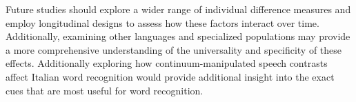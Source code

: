 
Future studies should explore a wider range of individual difference measures and employ longitudinal designs to assess how these factors interact over time. Additionally, examining other languages and specialized populations may provide a more comprehensive understanding of the universality and specificity of these effects. Additionally exploring how continuum-manipulated speech contrasts affect Italian word recognition would provide additional insight into the exact cues that are most useful for word recognition.